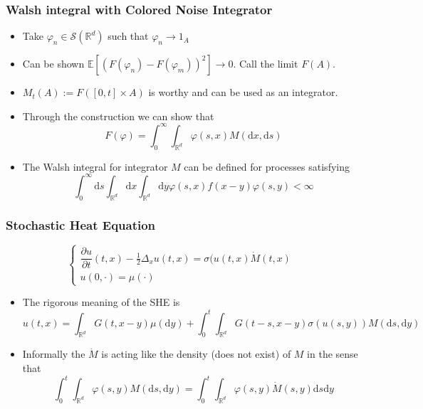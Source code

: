 \documentclass[11pt]{beamer}
\numberwithin{equation}{section}
\newcommand{\R}{\mathbb{R}}
\newcommand{\E}{\mathbb{E}}
\newcommand{\ud}{\ensuremath{\mathrm{d}}}
\begin{document}
\begin{frame}[t]
	\frametitle{Walsh integral with Colored Noise Integrator}
	
	\begin{itemize}
		\item Take $\varphi_n \in \mathscr{S}(\R^d)$ such that $\varphi_n \to 1_A$
		\item Can be shown $\E[(F(\varphi_n) - F(\varphi_m))^2] \to 0$. Call the limit $F(A)$.
		\item $M_t(A) := F([0,t] \times A)$ is worthy and can be used as an integrator. 
		\item Through the construction we can show that 
		\[
		F(\varphi) = \int_0^\infty \int_{\R^d} \varphi(s,x) M(\ud x, \ud s)
		\]
		\item The Walsh integral for integrator $M$ can be defined for processes satisfying
			\[
		\int_0^\infty \ud s \int_{\R^d} \ud x \int_{\R^d} \ud y \varphi(s,x) f(x-y) \varphi(s,y) < \infty
		\] 
	\end{itemize}
\end{frame}

\begin{frame}[t]
	\frametitle{Stochastic Heat Equation}
	\[
	 \begin{cases}
	\dfrac{\partial u}{\partial t}(t,x)- \frac{1}{2}\Delta_xu(t,x) = \sigma(u(t,x)\dot{M}(t,x) &
	\\ u(0,\cdot) = \mu(\cdot)  &
	\end{cases}
	\]
	
\begin{itemize}
	\item The rigorous meaning of the SHE is 
	\[
	u(t,x) = \int_{\R^d} G(t,x-y) \mu(\ud y) + \int_0^t \int_{\R^d}G(t-s,x-y)\sigma(u(s,y))M(\ud s, \ud y)
	\]
	\item Informally the $\dot{M}$ is acting like the density (does not exist) of $M$ in the sense that 
	\[
	\int_0^t \int_{\R^d}\varphi(s,y) M(\ud s, \ud y) = \int_0^t \int_{\R^d}\varphi(s,y)\dot{M}(s, y)\ud s \ud y
	\]
\end{itemize}
\end{frame}
\end{document}
